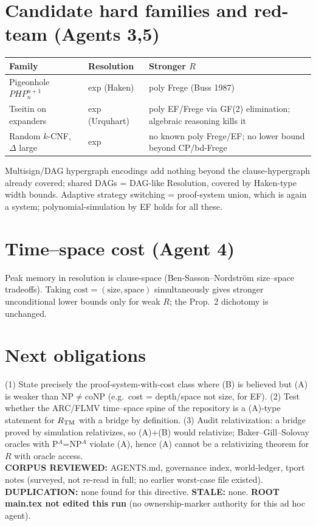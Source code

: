 \documentclass{article}\usepackage{amsmath,amssymb,amsthm}
\begin{document}
\section*{Candidate hard families and red-team (Agents 3,5)}
\begin{tabular}{lll}
Family & Resolution & Stronger $R$\\\hline
Pigeonhole $PHP^{n+1}_n$ & exp (Haken) & poly Frege (Buss 1987)\\
Tseitin on expanders & exp (Urquhart) & poly EF/Frege via GF(2) elimination; algebraic reasoning kills it\\
Random $k$-CNF, $\Delta$ large & exp & no known poly Frege/EF; no lower bound beyond CP/bd-Frege\\
\end{tabular}
Multisign/DAG hypergraph encodings add nothing beyond the clause-hypergraph already covered; shared DAGs = DAG-like Resolution, covered by Haken-type width bounds. Adaptive strategy switching = proof-system union, which is again a system; polynomial-simulation by EF holds for all these.

\section*{Time--space cost (Agent 4)}
Peak memory in resolution is clause-space (Ben-Sasson--Nordstr\"om size--space tradeoffs). Taking $\mathrm{cost}=(\text{size},\text{space})$ simultaneously gives stronger unconditional lower bounds only for weak $R$; the Prop.~2 dichotomy is unchanged.

\section*{Next obligations}
(1) State precisely the proof-system-with-cost class where (B) is believed but (A) is weaker than NP$\ne$coNP (e.g.\ cost = depth/space not size, for EF). (2) Test whether the ARC/FLMV time--space spine of the repository is a (A)-type statement for $R_{\rm TM}$ with a bridge by definition. (3) Audit relativization: a bridge proved by simulation relativizes, so (A)+(B) would relativize; Baker--Gill--Solovay oracles with P$^A$=NP$^A$ violate (A), hence (A) cannot be a relativizing theorem for $R$ with oracle access.
\\\textbf{CORPUS REVIEWED:} AGENTS.md, governance index, world-ledger, tport notes (surveyed, not re-read in full; no earlier worst-case file existed). \textbf{DUPLICATION:} none found for this directive. \textbf{STALE:} none. \textbf{ROOT main.tex not edited this run} (no ownership-marker authority for this ad hoc agent).
\end{document}

